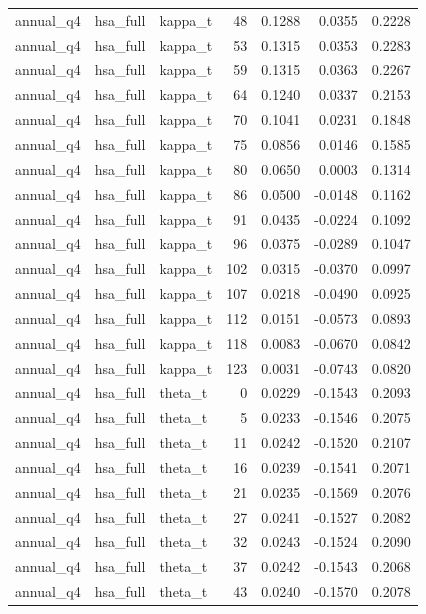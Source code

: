 \begin{tabular}{lllrrrr}
annual\_q4 & hsa\_full & kappa\_t & 48 & 0.1288 & 0.0355 & 0.2228 \\
annual\_q4 & hsa\_full & kappa\_t & 53 & 0.1315 & 0.0353 & 0.2283 \\
annual\_q4 & hsa\_full & kappa\_t & 59 & 0.1315 & 0.0363 & 0.2267 \\
annual\_q4 & hsa\_full & kappa\_t & 64 & 0.1240 & 0.0337 & 0.2153 \\
annual\_q4 & hsa\_full & kappa\_t & 70 & 0.1041 & 0.0231 & 0.1848 \\
annual\_q4 & hsa\_full & kappa\_t & 75 & 0.0856 & 0.0146 & 0.1585 \\
annual\_q4 & hsa\_full & kappa\_t & 80 & 0.0650 & 0.0003 & 0.1314 \\
annual\_q4 & hsa\_full & kappa\_t & 86 & 0.0500 & -0.0148 & 0.1162 \\
annual\_q4 & hsa\_full & kappa\_t & 91 & 0.0435 & -0.0224 & 0.1092 \\
annual\_q4 & hsa\_full & kappa\_t & 96 & 0.0375 & -0.0289 & 0.1047 \\
annual\_q4 & hsa\_full & kappa\_t & 102 & 0.0315 & -0.0370 & 0.0997 \\
annual\_q4 & hsa\_full & kappa\_t & 107 & 0.0218 & -0.0490 & 0.0925 \\
annual\_q4 & hsa\_full & kappa\_t & 112 & 0.0151 & -0.0573 & 0.0893 \\
annual\_q4 & hsa\_full & kappa\_t & 118 & 0.0083 & -0.0670 & 0.0842 \\
annual\_q4 & hsa\_full & kappa\_t & 123 & 0.0031 & -0.0743 & 0.0820 \\
annual\_q4 & hsa\_full & theta\_t & 0 & 0.0229 & -0.1543 & 0.2093 \\
annual\_q4 & hsa\_full & theta\_t & 5 & 0.0233 & -0.1546 & 0.2075 \\
annual\_q4 & hsa\_full & theta\_t & 11 & 0.0242 & -0.1520 & 0.2107 \\
annual\_q4 & hsa\_full & theta\_t & 16 & 0.0239 & -0.1541 & 0.2071 \\
annual\_q4 & hsa\_full & theta\_t & 21 & 0.0235 & -0.1569 & 0.2076 \\
annual\_q4 & hsa\_full & theta\_t & 27 & 0.0241 & -0.1527 & 0.2082 \\
annual\_q4 & hsa\_full & theta\_t & 32 & 0.0243 & -0.1524 & 0.2090 \\
annual\_q4 & hsa\_full & theta\_t & 37 & 0.0242 & -0.1543 & 0.2068 \\
annual\_q4 & hsa\_full & theta\_t & 43 & 0.0240 & -0.1570 & 0.2078 \\

\end{tabular}
